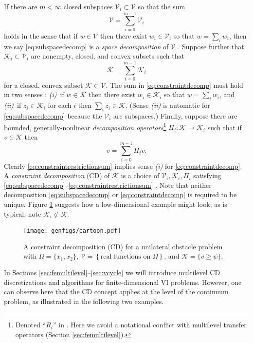 \documentclass[letterpaper,final,12pt,reqno]{amsart}
\theoremstyle{cstyle}
\theoremstyle{cstyle*}
\theoremstyle{dstyle}
\numberwithin{equation}{section}
\numberwithin{figure}{section}
\numberwithin{table}{section}
\numberwithin{theorem}{section}
\newcommand{\cK}{\mathcal{K}}
\newcommand{\cV}{\mathcal{V}}
\begin{document}
If there are $m<\infty$ closed subspaces $\cV_i \subset \cV$ so that the sum
\begin{equation}
\cV = \sum_{i=0}^{m-1} \cV_i \label{eq:subspacedecomp}
\end{equation}
holds in the sense that if $w \in \cV$ then there exist $w_i \in \cV_i$ so that $w = \sum_i w_i$, then we say \eqref{eq:subspacedecomp} is a \emph{space decomposition} of $\cV$ \cite{Xu1992}.  Suppose further that $\cK_i \subset \cV_i$ are nonempty, closed, and convex subsets such that
\begin{equation}
\cK = \sum_{i=0}^{m-1} \cK_i \label{eq:constraintdecomp}
\end{equation}
for a closed, convex subset $\cK \subset \cV$.  The sum in \eqref{eq:constraintdecomp} must hold in two senses \cite{TaiTseng2002}: \emph{(i)}~if $w \in \cK$ then there exist $w_i \in \cK_i$ so that $w = \sum_i w_i$, and \emph{(ii)}~if $z_i \in \cK_i$ for each $i$ then $\sum_i z_i \in \cK$.  (Sense \emph{(ii)} is automatic for \eqref{eq:subspacedecomp} because the $\cV_i$ are subspaces.)  Finally, suppose there are bounded, generally-nonlinear \emph{decomposition operators}\footnote{Denoted ``$R_i$'' in \cite{Tai2003}.  Here we avoid a notational conflict with multilevel transfer operators (Section \ref{sec:femultilevel}).} $\Pi_i : \cK \to \cK_i$ such that if $v \in \cK$ then
\begin{equation}
v = \sum_{i=0}^{m-1} \Pi_i v.  \label{eq:constraintrestrictionsum}
\end{equation}
Clearly \eqref{eq:constraintrestrictionsum} implies sense \emph{(i)} for \eqref{eq:constraintdecomp}. A \emph{constraint decomposition} (CD) of $\cK$ is a choice of $\cV_i,\cK_i,\Pi_i$ satisfying \eqref{eq:subspacedecomp}--\eqref{eq:constraintrestrictionsum} \cite{Tai2003}.  Note that neither decomposition \eqref{eq:subspacedecomp} or \eqref{eq:constraintdecomp} is required to be unique.  Figure \ref{fig:cartoon} suggests how a low-dimensional example might look; as is typical, note $\cK_i \not\subset \cK$.

\begin{figure}[ht]
\texttt{[image: genfigs/cartoon.pdf]}
\caption{A constraint decomposition (CD) for a unilateral obstacle problem with $\Omega=\{x_1,x_2\}$, $\mathcal{V}=\left\{\text{real functions on } \Omega\right\}$, and $\mathcal{K}=\{v\ge \psi\}$.}
\label{fig:cartoon}
\end{figure}

In Sections \ref{sec:femultilevel}--\ref{sec:vcycle} we will introduce multilevel CD discretizations and algorithms for finite-dimensional VI problems.  However, one can observe here that the CD concept applies at the level of the continuum problem, as illustrated in the following two examples.
\end{document}
